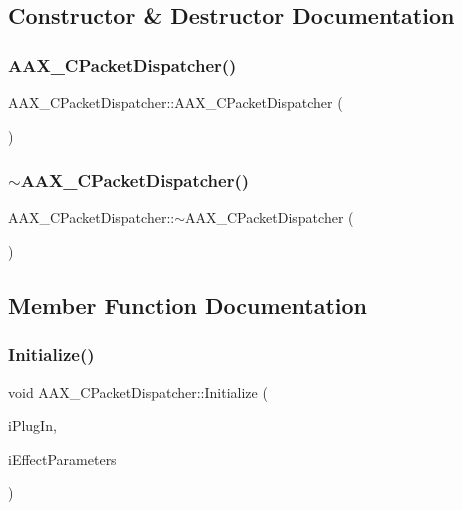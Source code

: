 \subsection{Constructor \& Destructor Documentation}
\mbox{\label{a01529_a1b9b60206849807c11045fb865a4dd49}} 
\subsubsection{\texorpdfstring{AAX\_CPacketDispatcher()}{AAX\_CPacketDispatcher()}}
{\footnotesize\ttfamily A\+A\+X\+\_\+\+C\+Packet\+Dispatcher\+::\+A\+A\+X\+\_\+\+C\+Packet\+Dispatcher (\begin{DoxyParamCaption}{ }\end{DoxyParamCaption})}

\mbox{\label{a01529_a1eb3ce17e895e30106316c33bc44307f}} 
\subsubsection{\texorpdfstring{$\sim$AAX\_CPacketDispatcher()}{~AAX\_CPacketDispatcher()}}
{\footnotesize\ttfamily A\+A\+X\+\_\+\+C\+Packet\+Dispatcher\+::$\sim$\+A\+A\+X\+\_\+\+C\+Packet\+Dispatcher (\begin{DoxyParamCaption}{ }\end{DoxyParamCaption})}



\subsection{Member Function Documentation}
\mbox{\label{a01529_abc64d59b8b9f652013ccf848987ea797}} 
\subsubsection{\texorpdfstring{Initialize()}{Initialize()}}
{\footnotesize\ttfamily void A\+A\+X\+\_\+\+C\+Packet\+Dispatcher\+::\+Initialize (\begin{DoxyParamCaption}\item[{\mbox{\hyperlink{a01789}{A\+A\+X\+\_\+\+I\+Controller}} $\ast$}]{i\+Plug\+In,  }\item[{\mbox{\hyperlink{a01825}{A\+A\+X\+\_\+\+I\+Effect\+Parameters}} $\ast$}]{i\+Effect\+Parameters }\end{DoxyParamCaption})}

